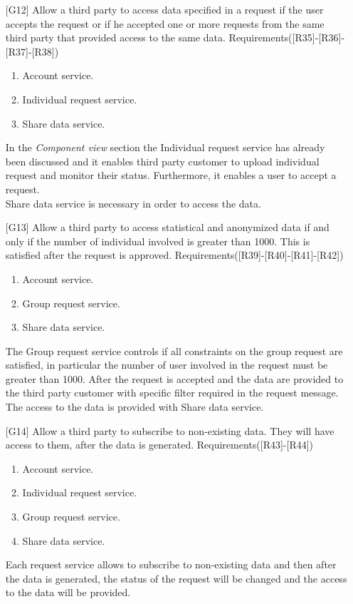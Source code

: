 \begin{itemize}
\item[{[G12]}] Allow a third party to access data specified in a request if the user accepts the request or if he accepted one or more requests from the same third party that provided access to the same data. Requirements([R35]-[R36]-[R37]-[R38])
	\begin{enumerate}
	\item Account service.
	\item Individual request service.
	\item Share data service.
	\end{enumerate}
In the \textit{Component view} section the Individual request service has already been discussed and it enables third party customer to upload individual request and monitor their status. Furthermore, it enables a user to accept a request. \\
Share data service is necessary in order to access the data.	
	
\item[{[G13]}] Allow a third party to access statistical and anonymized data if and only if the number of individual involved is greater than 1000. This is satisfied after the request is approved. Requirements([R39]-[R40]-[R41]-[R42])
	\begin{enumerate}
	\item Account service.
	\item Group request service.
	\item Share data service. 
	\end{enumerate}
The Group request service controls if all constraints on the group request are satisfied, in particular the number of user involved in the
request must be greater than 1000. 
After the request is accepted and the data are provided to the third party customer with specific filter required in the request message. 
The access to the data is provided with Share data service.
	
\item[{[G14]}] Allow a third party to subscribe to non-existing data. They will have access to them, after the data is generated. Requirements([R43]-[R44])
	\begin{enumerate}
	\item Account service.
	\item Individual request service.
	\item Group request service.
	\item Share data service.
	\end{enumerate}
Each request service allows to subscribe to non-existing data and then after the data is generated, the status of the request will be changed
and the access to the data will be provided.
\end{itemize}
